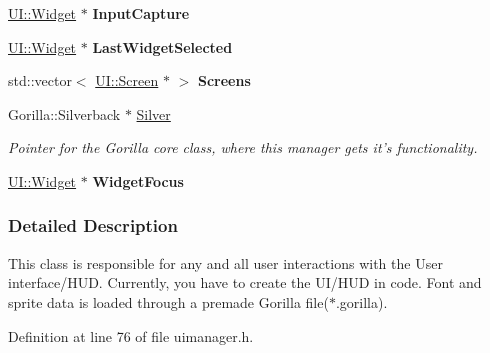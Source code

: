 \begin{DoxyCompactItemize}
\item 
\hypertarget{classMezzanine_1_1UIManager_a79ffa786184180adf026e8992973289c}{
\hyperlink{classMezzanine_1_1UI_1_1Widget}{UI::Widget} $\ast$ {\bfseries InputCapture}}
\label{classMezzanine_1_1UIManager_a79ffa786184180adf026e8992973289c}

\item 
\hypertarget{classMezzanine_1_1UIManager_a375acb1b3c751bc7e76f82d55f9d15d1}{
\hyperlink{classMezzanine_1_1UI_1_1Widget}{UI::Widget} $\ast$ {\bfseries LastWidgetSelected}}
\label{classMezzanine_1_1UIManager_a375acb1b3c751bc7e76f82d55f9d15d1}

\item 
\hypertarget{classMezzanine_1_1UIManager_a2021e925ef8115dd42a6ce1a151ccf22}{
std::vector$<$ \hyperlink{classMezzanine_1_1UI_1_1Screen}{UI::Screen} $\ast$ $>$ {\bfseries Screens}}
\label{classMezzanine_1_1UIManager_a2021e925ef8115dd42a6ce1a151ccf22}

\item 
\hypertarget{classMezzanine_1_1UIManager_af04023901dcec07fea9e6549fdf1c93f}{
Gorilla::Silverback $\ast$ \hyperlink{classMezzanine_1_1UIManager_af04023901dcec07fea9e6549fdf1c93f}{Silver}}
\label{classMezzanine_1_1UIManager_af04023901dcec07fea9e6549fdf1c93f}

\begin{DoxyCompactList}\small\item\em Pointer for the Gorilla core class, where this manager gets it's functionality. \item\end{DoxyCompactList}\item 
\hypertarget{classMezzanine_1_1UIManager_a6ee130f7ac74f239e02c68919671afa4}{
\hyperlink{classMezzanine_1_1UI_1_1Widget}{UI::Widget} $\ast$ {\bfseries WidgetFocus}}
\label{classMezzanine_1_1UIManager_a6ee130f7ac74f239e02c68919671afa4}

\end{DoxyCompactItemize}


\subsubsection{Detailed Description}
This class is responsible for any and all user interactions with the User interface/HUD. Currently, you have to create the UI/HUD in code. Font and sprite data is loaded through a premade Gorilla file($\ast$.gorilla). 

Definition at line 76 of file uimanager.h.



